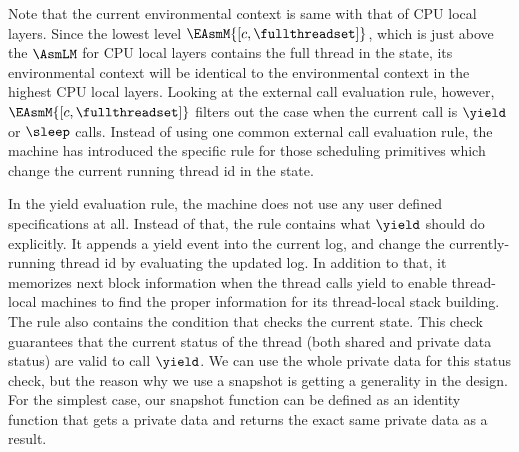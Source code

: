 Note that the current environmental context is same with that of CPU local layers. 
Since the lowest level $\EAsmM{[c, \fullthreadset]}$, which is just above the $\AsmLM$ for CPU local layers
contains the full thread in the state, 
its environmental context will be identical to the environmental context in 
the highest CPU local layers.
Looking at the external call evaluation rule, however, $\EAsmM{[c, \fullthreadset]}$
filters out the case when the current call is 
$\yield$ or $\sleep$ calls. 
Instead of using one common external call evaluation rule, the machine has introduced the 
specific rule for those scheduling primitives 
which change the current running thread id in the state.
\begin{small}
\begin{mathpar}
\end{mathpar}
\end{small}
In the yield evaluation rule, the machine does not use any user defined specifications at all. 
Instead of that, the rule contains what $\yield$ should do explicitly. 
It appends a yield event into the current log, and change the currently-running thread id by evaluating the updated log.
In addition to that, it memorizes next block information when the thread calls yield to enable thread-local machines to
find the proper information for its thread-local stack building. 
The rule also contains the condition that checks the current state. 
This check guarantees that the current status of the thread (both shared and private data status) are valid to call $\yield$. 
We can use the whole private data for this status check, but the reason why we use a snapshot is getting a generality in the design. 
For the simplest case, our snapshot function can be defined as an identity function 
that gets a private data and returns the exact same private data as a result.

